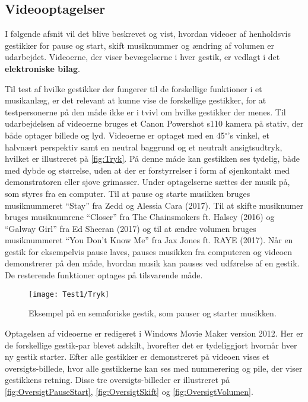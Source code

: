 \subsection{Videooptagelser}
\label{VideooptagelserValgAfGestikker}
%
I følgende afsnit vil det blive beskrevet og vist, hvordan videoer af henholdsvis gestikker for pause og start, skift musiknummer og ændring af volumen er udarbejdet. Videoerne, der viser bevægelserne i hver gestik, er vedlagt i det \textbf{elektroniske bilag}.

Til test af hvilke gestikker der fungerer til de forskellige funktioner i et musikanlæg, er det relevant at kunne vise de forskellige gestikker, for at testpersonerne på den måde ikke er i tvivl om hvilke gestikker der menes. Til udarbejdelsen af videoerne bruges et Canon Powershot s110 kamera på stativ, der både optager billede og lyd. Videoerne er optaget med en 45$^{\circ}$'s vinkel, et halvnært perspektiv samt en neutral baggrund og et neutralt ansigtsudtryk, hvilket er illustreret på \autoref{fig:Tryk}. På denne måde kan gestikken ses tydelig, både med dybde og størrelse, uden at der er forstyrrelser i form af øjenkontakt med demonstratoren eller sjove grimasser. Under optagelserne sættes der musik på, som styres fra en computer. Til at pause og starte musikken bruges musiknummeret \enquote{Stay} fra Zedd og Alessia Cara (2017). Til at skifte musiknumer bruges musiknumrene \enquote{Closer} fra The Chainsmokers ft. Halsey (2016) og \enquote{Galway Girl} fra Ed Sheeran (2017) og til at ændre volumen bruges musiknummeret \enquote{You Don't Know Me} fra Jax Jones ft. RAYE (2017). Når en gestik for eksempelvis pause laves, pauses musikken fra computeren og videoen demonstrerer på den måde, hvordan musik kan pauses ved udførelse af en gestik. De resterende funktioner optages på tilsvarende måde.
%
\begin{figure}[H]
	\centering
	\texttt{[image: Test1/Tryk]}
	\caption{Eksempel på en semaforiske gestik, som pauser og starter musikken.}
	\label{fig:Tryk}
\end{figure}
\noindent
%
Optagelsen af videoerne er redigeret i Windows Movie Maker version 2012. Her er de forskellige gestik-par blevet adskilt, hvorefter det er tydeliggjort hvornår hver ny gestik starter. Efter alle gestikker er demonstreret på videoen vises et oversigts-billede, hvor alle gestikkerne kan ses med nummerering og pile, der viser gestikkens retning. Disse tre oversigts-billeder er illustreret på \autoref{fig:OversigtPauseStart}, \autoref{fig:OversigtSkift} og \autoref{fig:OversigtVolumen}.
